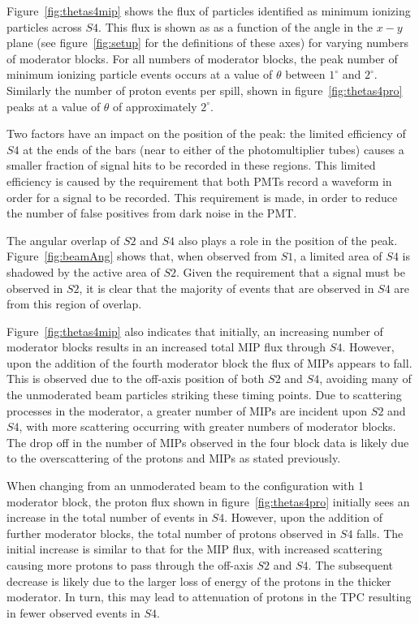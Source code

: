     Figure~\ref{fig:thetas4mip} shows the flux of particles identified as minimum ionizing particles across $\mathit{S4}$.
    This flux is shown as as a function of the angle in the $x-y$ plane (see figure~\ref{fig:setup} for the definitions of these axes) for varying numbers of moderator blocks.
    For all numbers of moderator blocks, the peak number of minimum ionizing particle events occurs at a value of $\theta$ between $1^{\circ}$ and $2^{\circ}$.
    Similarly the number of proton events per spill, shown in figure~\ref{fig:thetas4pro} peaks at a value of $\theta$ of approximately $2^{\circ}$.
    
    Two factors have an impact on the position of the peak:
    the limited efficiency of $\mathit{S4}$ at the ends of the bars (near to either of the photomultiplier tubes) causes a smaller fraction of signal hits to be recorded in these regions. 
    This limited efficiency is caused by the requirement that both PMTs record a waveform in order for a signal to be recorded.
    This requirement is made, in order to reduce the number of false positives from dark noise in the PMT.
    
    The angular overlap of $\mathit{S2}$ and $\mathit{S4}$ also plays a role in the position of the peak. 
    Figure~\ref{fig:beamAng} shows that, when observed from $\mathit{S1}$, a limited area of $\mathit{S4}$ is shadowed by the active area of $\mathit{S2}$.
    Given the requirement that a signal must be observed in $\mathit{S2}$, it is clear that the majority of events that are observed in $\mathit{S4}$ are from this region of overlap.
    
    Figure~\ref{fig:thetas4mip} also indicates that initially, an increasing number of moderator blocks results in an increased total MIP flux through $\mathit{S4}$. 
    However, upon the addition of the fourth moderator block the flux of MIPs appears to fall.
    This is observed due to the off-axis position of both $\mathit{S2}$ and $\mathit{S4}$, avoiding many of the unmoderated beam particles striking these timing points.
    Due to scattering processes in the moderator, a greater number of MIPs are incident upon $\mathit{S2}$ and $\mathit{S4}$, with more scattering occurring with greater numbers of moderator blocks.
    The drop off in the number of MIPs observed in the four block data is likely due to the overscattering of the protons and MIPs as stated previously.
    
    When changing from an unmoderated beam to the configuration with 1 moderator block, the proton flux shown in figure~\ref{fig:thetas4pro} initially sees an increase in the total number of events in $\mathit{S4}$.
    However, upon the addition of further moderator blocks, the total number of protons observed in $\mathit{S4}$ falls.
    The initial increase is similar to that for the MIP flux, with increased scattering causing more protons to pass through the off-axis $\mathit{S2}$ and $\mathit{S4}$.
    The subsequent decrease is likely due to the larger loss of energy of the protons in the thicker moderator.
    In turn, this may lead to attenuation of protons in the TPC resulting in fewer observed events in $\mathit{S4}$.
    
